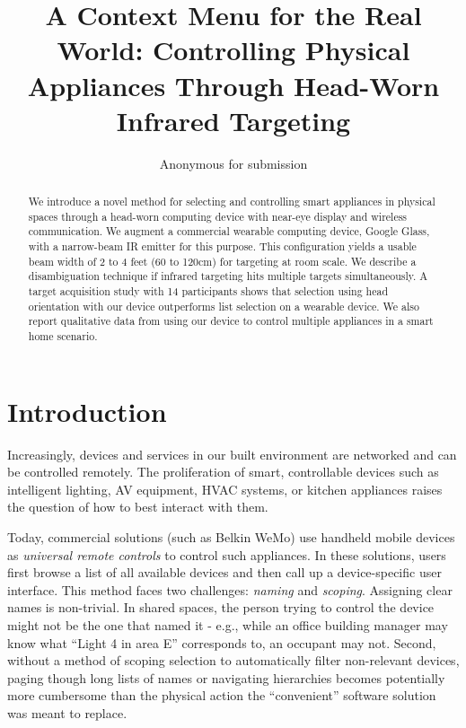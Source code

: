 \documentclass{sigchi}
\begin{document}
\title{A Context Menu for the Real World: Controlling Physical Appliances Through Head-Worn Infrared Targeting}

\author{
 \alignauthor Anonymous for submission
}

\maketitle

\begin{abstract}
We introduce a novel method for selecting and controlling smart appliances in physical spaces through a head-worn computing device with near-eye display and wireless communication. We augment a commercial wearable computing device, Google Glass, with a narrow-beam IR emitter for this purpose. This configuration yields a usable beam width of 2 to 4 feet (60 to 120cm) for targeting at room scale. We describe a disambiguation technique if infrared targeting hits multiple targets simultaneously. A target acquisition study with 14 participants shows that selection using head orientation with our device outperforms list selection on a wearable device. We also report qualitative data from using our device to control multiple appliances in a smart home scenario.

\end{abstract}



\section{Introduction}
Increasingly, devices and services in our built environment are networked and can be controlled remotely. The proliferation of smart, controllable devices such as intelligent lighting, AV equipment, HVAC systems, or kitchen appliances raises the question of how to best interact with them. 

Today, commercial solutions (such as Belkin WeMo) use handheld mobile devices as {\em universal remote controls} to control such appliances. In these solutions, users first browse a list of all available devices and then call up a device-specific user interface. This method faces two challenges: {\em naming} and {\em scoping}. Assigning clear names is non-trivial. In shared spaces, the person trying to control the device might not be the one that named it - e.g., while an office building manager may know what ``Light 4 in area E'' corresponds to, an occupant may not. Second, without a method of scoping selection to automatically filter non-relevant devices, paging though long lists of names or navigating hierarchies becomes potentially more cumbersome than the physical action the ``convenient'' software solution was meant to replace.
\end{document}
